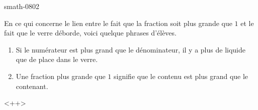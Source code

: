
\begin{corrige}{smath-0802}

    En ce qui concerne le lien entre le fait que la fraction soit plus grande que \( 1\) et le fait que le verre déborde, voici quelque phrases d'élèves.
    \begin{enumerate}
        \item
            Si le numérateur est plus grand que le dénominateur, il y a plus de liquide que de place dans le verre.
        \item
            Une fraction plus grande que \( 1\) signifie que le contenu est plus grand que le contenant.
    \end{enumerate}
    <++>

\end{corrige}
